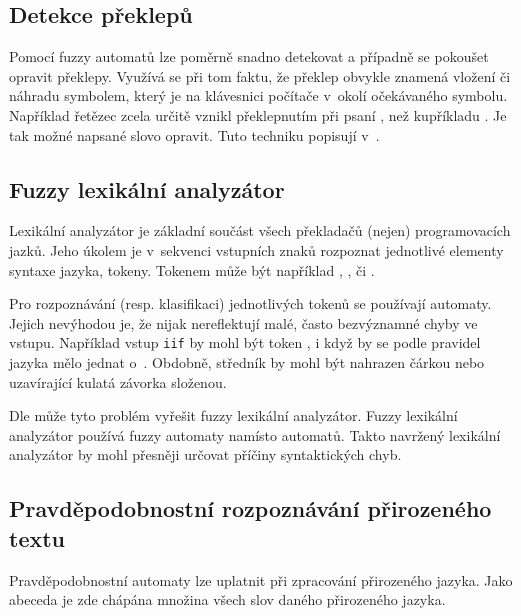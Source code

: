\subsection{Detekce překlepů} \label{subs:DetTyp}
Pomocí fuzzy automatů lze poměrně snadno detekovat a případně se pokoušet opravit překlepy. Využívá se při tom faktu, že překlep obvykle znamená vložení či náhradu symbolem, který je na klávesnici počítače v~okolí očekávaného symbolu. Například řetězec  zcela určitě vznikl překlepnutím při psaní , než kupříkladu . Je tak možné napsané slovo opravit. Tuto techniku popisují v~\cite{AndAbdAsm-ApprPattMatcFuzzLog, SnaKepAbrHas-AproxStriMatchFuzzAut}.


\subsection{Fuzzy lexikální analyzátor}
Lexikální analyzátor je základní součást všech překladačů (nejen) programovacích jazků. Jeho úkolem je v~sekvenci vstupních znaků rozpoznat jednotlivé elementy syntaxe jazyka, tokeny. Tokenem může být například , ,  či .

Pro rozpoznávání (resp. klasifikaci) jednotlivých tokenů se používají  automaty. Jejich nevýhodou je, že nijak nereflektují malé, často bezvýznamné chyby ve vstupu. Například vstup \texttt{iif} by mohl být token , i když by se podle pravidel jazyka mělo jednat o~. Obdobně, středník by mohl být nahrazen čárkou nebo uzavírající kulatá závorka složenou. 

Dle \cite{MatSalSalYu-LexAnaSimFinFuzAutMod} může tyto problém vyřešit fuzzy lexikální analyzátor. Fuzzy lexikální analyzátor používá fuzzy automaty namísto  automatů. Takto navržený lexikální analyzátor by mohl přesněji určovat příčiny syntaktických chyb.

\subsection{Pravděpodobnostní rozpoznávání přirozeného textu}
Pravděpodobnostní automaty lze uplatnit při zpracování přirozeného jazyka. Jako abeceda je zde chápána množina všech slov daného přirozeného jazyka. 

